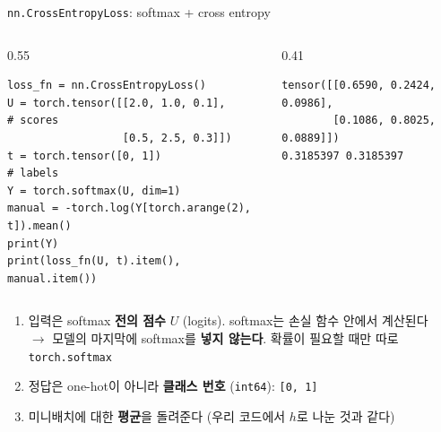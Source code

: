 \documentclass[aspectratio=169,11pt]{beamer}
\newcommand{\code}[1]{\texttt{#1}}
\begin{document}
\begin{frame}[fragile]{\code{nn.CrossEntropyLoss}: softmax + cross entropy}
\begin{columns}[T,onlytextwidth]
\begin{column}{0.55\textwidth}
\begin{lstlisting}
loss_fn = nn.CrossEntropyLoss()
U = torch.tensor([[2.0, 1.0, 0.1],     # scores
                  [0.5, 2.5, 0.3]])
t = torch.tensor([0, 1])               # labels
Y = torch.softmax(U, dim=1)
manual = -torch.log(Y[torch.arange(2), t]).mean()
print(Y)
print(loss_fn(U, t).item(), manual.item())
\end{lstlisting}
\end{column}
\begin{column}{0.41\textwidth}
\begin{lstlisting}[style=outstyle]
tensor([[0.6590, 0.2424, 0.0986],
        [0.1086, 0.8025, 0.0889]])
0.3185397 0.3185397
\end{lstlisting}
\end{column}
\end{columns}
\begin{keybox}
\small
\begin{enumerate}
\item 입력은 softmax \textbf{전의 점수} $U$ (logits). softmax는 손실 함수 안에서 계산된다\\
$\to$ 모델의 마지막에 softmax를 \textbf{넣지 않는다}. 확률이 필요할 때만 따로 \code{torch.softmax}
\item 정답은 one-hot이 아니라 \textbf{클래스 번호} (\code{int64}): \code{[0, 1]}
\item 미니배치에 대한 \textbf{평균}을 돌려준다 (우리 코드에서 $h$로 나눈 것과 같다)
\end{enumerate}
\end{keybox}
\end{frame}
\end{document}

